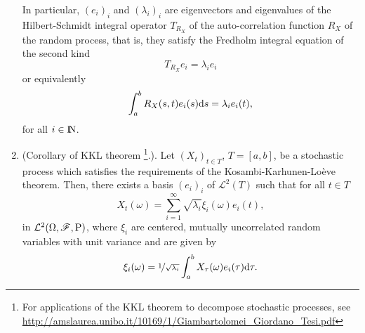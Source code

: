 \documentclass[a4paper,10pt]{scrbook}
\begin{document}
\begin{enumerate}
       In particular, \((e_i)_i\) and \((\lambda_i)_i\) are eigenvectors and eigenvalues of the 
       Hilbert-Schmidt integral operator \(T_{R_X}\) of the auto-correlation function \(R_X\) of the 
       random process, that is, they satisfy the Fredholm integral equation of the second kind
       \[
        T_{R_X}e_i = \lambda_i e_i
       \]
       or equivalently
       \[
        \int_{a}^{b} R_X(s,t) e_i(s) \mathrm{d} s = \lambda_i e_i(t),
       \]
       for all $i\in\N$.
 \item (Corollary of KKL theorem%
	\footnote{For applications of the KKL theorem to decompose stochastic processes, see 
	\url{http://amslaurea.unibo.it/10169/1/Giambartolomei_Giordano_Tesi.pdf}}.). 
	Let \((X_t)_{t\in T}\), \(T=[a,b]\), be a stochastic process 
       which satisfies the requirements of the Kosambi-Karhunen-Lo{\`e}ve theorem. Then, there 
       exists a basis \((e_i)_i\) of \(\mathcal{L}^2(T)\) such that for all \(t\in T\)
       \[
        X_t(\omega) = \sum_{i=1}^{\infty} \sqrt{\lambda_i}\xi_i(\omega)e_i(t),
       \]
       in \(\mathcal{L}^2(\Omega,\mathscr{F},\mathrm{P})\), where \(\xi_i\) are centered, mutually uncorrelated random
       variables with unit variance and are given by
       \[
        \xi_i(\omega) = \nicefrac{1}{\sqrt{\lambda_i}}\int_{a}^{b} X_{\tau}(\omega) e_i(\tau) \mathrm{d} \tau.
       \]
\end{enumerate}
\end{document}
